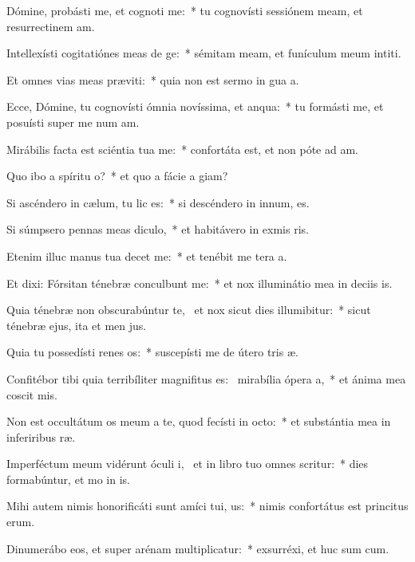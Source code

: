 \item Dómine, probásti me, et cognoti me:~* tu cognovísti sessiónem meam, et resurrectinem am.
\item Intellexísti cogitatiónes meas de ge:~* sémitam meam, et funículum meum intiti.
\item Et omnes vias meas præviti:~* quia non est sermo in gua a.
\item Ecce, Dómine, tu cognovísti ómnia novíssima, et anqua:~* tu formásti me, et posuísti super me num am.
\item Mirábilis facta est sciéntia tua  me:~* confortáta est, et non póte ad am.
\item Quo ibo a spíritu o?~* et quo a fácie a giam?
\item Si ascéndero in cælum, tu lic es:~* si descéndero in innum, es.
\item Si súmpsero pennas meas diculo,~* et habitávero in exmis ris.
\item Etenim illuc manus tua decet me:~* et tenébit me tera a.
\item Et dixi: Fórsitan ténebræ conculbunt me:~* et nox illuminátio mea in deciis is.
\item Quia ténebræ non obscurabúntur  te,~\pscross{} et nox sicut dies illumibitur:~* sicut ténebræ ejus, ita et men jus.
\item Quia tu possedísti renes os:~* suscepísti me de útero tris æ.
\item Confitébor tibi quia terribíliter magnifitus es:~\pscross{} mirabília ópera a,~* et ánima mea coscit mis.
\item Non est occultátum os meum a te, quod fecísti in octo:~* et substántia mea in inferiribus ræ.
\item Imperféctum meum vidérunt óculi i,~\pscross{} et in libro tuo omnes scritur:~* dies formabúntur, et mo in is.
\item Mihi autem nimis honorificáti sunt amíci tui, us:~* nimis confortátus est princitus erum.
\item Dinumerábo eos, et super arénam multiplicatur:~* exsurréxi, et huc sum cum.
